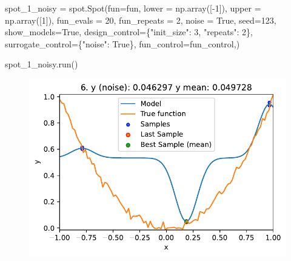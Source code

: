 \documentclass[
  letterpaper,
  DIV=11,
  numbers=noendperiod]{scrreprt}
\newenvironment{Shaded}{\begin{snugshade}}{\end{snugshade}}
\newcommand{\DecValTok}[1]{\textcolor[rgb]{0.68,0.00,0.00}{#1}}
\newcommand{\NormalTok}[1]{\textcolor[rgb]{0.00,0.23,0.31}{#1}}
\newcommand{\OperatorTok}[1]{\textcolor[rgb]{0.37,0.37,0.37}{#1}}
\newcommand{\StringTok}[1]{\textcolor[rgb]{0.13,0.47,0.30}{#1}}
\newcommand{\VariableTok}[1]{\textcolor[rgb]{0.07,0.07,0.07}{#1}}
\begin{document}
\begin{Shaded}
\begin{Highlighting}[]
\NormalTok{spot\_1\_noisy }\OperatorTok{=}\NormalTok{ spot.Spot(fun}\OperatorTok{=}\NormalTok{fun,}
\NormalTok{                   lower }\OperatorTok{=}\NormalTok{ np.array([}\OperatorTok{{-}}\DecValTok{1}\NormalTok{]),}
\NormalTok{                   upper }\OperatorTok{=}\NormalTok{ np.array([}\DecValTok{1}\NormalTok{]),}
\NormalTok{                   fun\_evals }\OperatorTok{=} \DecValTok{20}\NormalTok{,}
\NormalTok{                   fun\_repeats }\OperatorTok{=} \DecValTok{2}\NormalTok{,}
\NormalTok{                   noise }\OperatorTok{=} \VariableTok{True}\NormalTok{,}
\NormalTok{                   seed}\OperatorTok{=}\DecValTok{123}\NormalTok{,}
\NormalTok{                   show\_models}\OperatorTok{=}\VariableTok{True}\NormalTok{,}
\NormalTok{                   design\_control}\OperatorTok{=}\NormalTok{\{}\StringTok{"init\_size"}\NormalTok{: }\DecValTok{3}\NormalTok{,}
                                   \StringTok{"repeats"}\NormalTok{: }\DecValTok{2}\NormalTok{\},}
\NormalTok{                   surrogate\_control}\OperatorTok{=}\NormalTok{\{}\StringTok{"noise"}\NormalTok{: }\VariableTok{True}\NormalTok{\},}
\NormalTok{                   fun\_control}\OperatorTok{=}\NormalTok{fun\_control,)}
\end{Highlighting}
\end{Shaded}

\begin{Shaded}
\begin{Highlighting}[]
\NormalTok{spot\_1\_noisy.run()}
\end{Highlighting}
\end{Shaded}

\begin{figure}[H]

{\centering \includegraphics{013_num_spot_noisy_files/figure-pdf/cell-6-output-1.pdf}

}

\end{figure}
\end{document}
